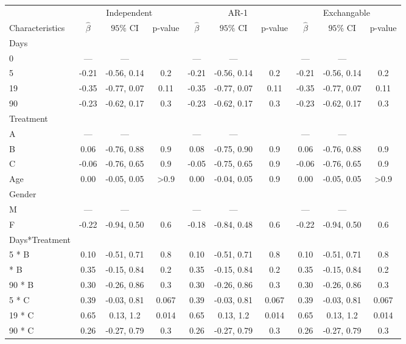 \begin{table}[!h]
\centering
\begin{tabular}{lccccccccc}
\toprule
\multicolumn{1}{c}{ } & \multicolumn{3}{c}{Independent} & \multicolumn{3}{c}{AR-1} & \multicolumn{3}{c}{Exchangable} \\
\cmidrule(l{3pt}r{3pt}){2-4} \cmidrule(l{3pt}r{3pt}){5-7} \cmidrule(l{3pt}r{3pt}){8-10}
Characteristics & $\widehat\beta$ & $95\%$ CI & p-value & $\widehat\beta$ & $95\%$ CI & p-value & $\widehat\beta$ & $95\%$ CI & p-value\\
\midrule
Days &  &  &  &  &  &  &  &  & \\
0 & — & — &  & — & — &  & — & — & \\
5 & -0.21 & -0.56, 0.14 & 0.2 & -0.21 & -0.56, 0.14 & 0.2 & -0.21 & -0.56, 0.14 & 0.2\\
19 & -0.35 & -0.77, 0.07 & 0.11 & -0.35 & -0.77, 0.07 & 0.11 & -0.35 & -0.77, 0.07 & 0.11\\
90 & -0.23 & -0.62, 0.17 & 0.3 & -0.23 & -0.62, 0.17 & 0.3 & -0.23 & -0.62, 0.17 & 0.3\\
\addlinespace
Treatment &  &  &  &  &  &  &  &  & \\
A & — & — &  & — & — &  & — & — & \\
B & 0.06 & -0.76, 0.88 & 0.9 & 0.08 & -0.75, 0.90 & 0.9 & 0.06 & -0.76, 0.88 & 0.9\\
C & -0.06 & -0.76, 0.65 & 0.9 & -0.05 & -0.75, 0.65 & 0.9 & -0.06 & -0.76, 0.65 & 0.9\\
Age & 0.00 & -0.05, 0.05 & >0.9 & 0.00 & -0.04, 0.05 & 0.9 & 0.00 & -0.05, 0.05 & >0.9\\
\addlinespace
Gender &  &  &  &  &  &  &  &  & \\
M & — & — &  & — & — &  & — & — & \\
F & -0.22 & -0.94, 0.50 & 0.6 & -0.18 & -0.84, 0.48 & 0.6 & -0.22 & -0.94, 0.50 & 0.6\\
Days*Treatment &  &  &  &  &  &  &  &  & \\
5 * B & 0.10 & -0.51, 0.71 & 0.8 & 0.10 & -0.51, 0.71 & 0.8 & 0.10 & -0.51, 0.71 & 0.8\\
\addlinespace
19 * B & 0.35 & -0.15, 0.84 & 0.2 & 0.35 & -0.15, 0.84 & 0.2 & 0.35 & -0.15, 0.84 & 0.2\\
90 * B & 0.30 & -0.26, 0.86 & 0.3 & 0.30 & -0.26, 0.86 & 0.3 & 0.30 & -0.26, 0.86 & 0.3\\
5 * C & 0.39 & -0.03, 0.81 & 0.067 & 0.39 & -0.03, 0.81 & 0.067 & 0.39 & -0.03, 0.81 & 0.067\\
19 * C & 0.65 & 0.13, 1.2 & 0.014 & 0.65 & 0.13, 1.2 & 0.014 & 0.65 & 0.13, 1.2 & 0.014\\
90 * C & 0.26 & -0.27, 0.79 & 0.3 & 0.26 & -0.27, 0.79 & 0.3 & 0.26 & -0.27, 0.79 & 0.3\\
\bottomrule
\end{tabular}
\end{table}
